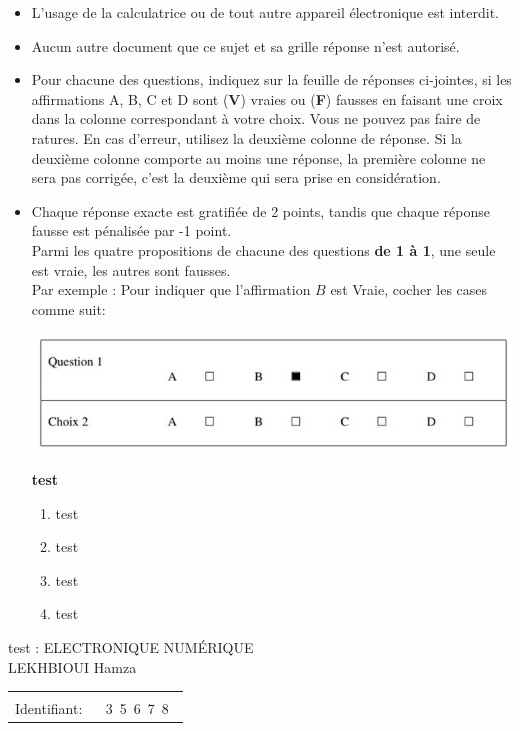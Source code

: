 \documentclass{book}%
\begin{document}
\begin{itemize}%
\item%
L'usage de la calculatrice ou de tout autre appareil électronique est interdit.%
\item%
Aucun autre document que ce sujet et sa grille réponse n'est autorisé.%
\item%
Pour chacune des questions, indiquez sur la feuille de réponses ci-jointes, si les affirmations A, B, C et D sont (\textbf{V}) vraies ou (\textbf{F}) fausses en faisant une croix dans la colonne correspondant à votre choix. Vous ne pouvez pas faire de ratures. En cas d'erreur, utilisez la deuxième colonne de réponse. Si la deuxième colonne comporte au moins une réponse, la première colonne ne sera pas corrigée, c'est la deuxième qui sera prise en considération.%
\item%
Chaque réponse exacte est gratifiée de 2 points, tandis que chaque réponse fausse est pénalisée par -1 point. \\ 	Parmi les quatre propositions de chacune des questions \textbf{de 1 à 1}, une seule est vraie, les autres sont fausses. \\ 	Par exemple : Pour indiquer que l'affirmation $B$ est Vraie, cocher les cases comme suit:  \\ \begin{center}	\includegraphics[scale=0.8]{reponses.png} \end{center}%
\thispagestyle{empty}%
\begin{exercise}%
\textbf{test }%
\begin{enumerate}[label=\textbf{\Alph*. }]%
\item%
test%
\item%
test%
\item%
test%
\item%
test%
\end{enumerate}%
\end{exercise}%
\end{itemize}%
\newpage%
\thispagestyle{empty}%
test : ELECTRONIQUE NUMÉRIQUE $\qquad \qquad \qquad \qquad \qquad \qquad \qquad \qquad$ LEKHBIOUI Hamza%
\begin{flushright}%
\begin{tabular}{|l|}%
\hline%
 \\%
\thispagestyle{empty}%
Identifiant: $\quad$ {\Large 3~5~6~7~8~}%
 \\%
\hline%
\end{tabular}%
\end{flushright}%
\end{document}
